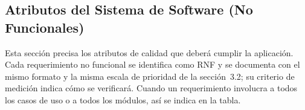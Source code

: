 \subsection{Atributos del Sistema de Software (No Funcionales)}

\providecommand{\rqA}{\dimexpr 0.22\linewidth-2\tabcolsep-1.25\arrayrulewidth\relax}
\providecommand{\rqB}{\dimexpr 0.22\linewidth-2\tabcolsep-1.25\arrayrulewidth\relax}
\providecommand{\rqC}{\dimexpr 0.22\linewidth-2\tabcolsep-1.25\arrayrulewidth\relax}
\providecommand{\rqD}{\dimexpr 0.34\linewidth-2\tabcolsep-1.25\arrayrulewidth\relax}
\providecommand{\rqBCD}{\dimexpr 0.78\linewidth-2\tabcolsep-1.75\arrayrulewidth\relax}

Esta sección precisa los atributos de calidad que deberá cumplir la aplicación. Cada requerimiento no funcional se identifica como RNF y se documenta con el mismo formato y la misma escala de prioridad de la sección~3.2; su criterio de medición indica cómo se verificará. Cuando un requerimiento involucra a todos los casos de uso o a todos los módulos, así se indica en la tabla.




